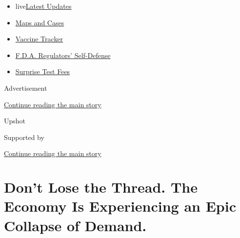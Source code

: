 \begin{itemize}
\tightlist
\item
  live\href{https://www.nytimes3xbfgragh.onion/2020/09/11/world/covid-19-coronavirus.html?name=styln-coronavirus-national\&region=TOP_BANNER\&block=storyline_menu_recirc\&action=click\&pgtype=Article\&impression_id=7c275de1-f4c9-11ea-a65e-239a33d4e80b\&variant=undefined}{Latest
  Updates}
\item
  \href{https://www.nytimes3xbfgragh.onion/interactive/2020/us/coronavirus-us-cases.html?name=styln-coronavirus-national\&region=TOP_BANNER\&block=storyline_menu_recirc\&action=click\&pgtype=Article\&impression_id=7c2784f0-f4c9-11ea-a65e-239a33d4e80b\&variant=undefined}{Maps
  and Cases}
\item
  \href{https://www.nytimes3xbfgragh.onion/interactive/2020/science/coronavirus-vaccine-tracker.html?name=styln-coronavirus-national\&region=TOP_BANNER\&block=storyline_menu_recirc\&action=click\&pgtype=Article\&impression_id=7c2784f1-f4c9-11ea-a65e-239a33d4e80b\&variant=undefined}{Vaccine
  Tracker}
\item
  \href{https://www.nytimes3xbfgragh.onion/2020/09/10/us/politics/fda-coronavirus-vaccine.html?name=styln-coronavirus-national\&region=TOP_BANNER\&block=storyline_menu_recirc\&action=click\&pgtype=Article\&impression_id=7c2784f2-f4c9-11ea-a65e-239a33d4e80b\&variant=undefined}{F.D.A.
  Regulators' Self-Defense}
\item
  \href{https://www.nytimes3xbfgragh.onion/2020/09/09/upshot/coronavirus-surprise-test-fees.html?name=styln-coronavirus-national\&region=TOP_BANNER\&block=storyline_menu_recirc\&action=click\&pgtype=Article\&impression_id=7c2784f3-f4c9-11ea-a65e-239a33d4e80b\&variant=undefined}{Surprise
  Test Fees}
\end{itemize}

Advertisement

\protect\hyperlink{after-top}{Continue reading the main story}

Upshot

Supported by

\protect\hyperlink{after-sponsor}{Continue reading the main story}

\hypertarget{dont-lose-the-thread-the-economy-is-experiencing-an-epic-collapse-of-demand}{%
\section{Don't Lose the Thread. The Economy Is Experiencing an Epic
Collapse of
Demand.}\label{dont-lose-the-thread-the-economy-is-experiencing-an-epic-collapse-of-demand}}

